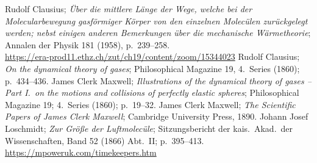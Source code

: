 \begin{thebibliography}{99}
 Rudolf Clausius; \textit{\"Uber die mittlere L\"ange der Wege, welche bei der
       Molecularbewegung gasf\"ormiger K\"orper von den einzelnen Molec\"ulen zur\"uckgelegt werden;
       nebst einigen anderen Bemerkungen \"uber die mechanische W\"armetheorie}; Annalen der Physik 181 (1958),
       p.\ 239--258. \\
       \url{https://era-prod11.ethz.ch/zut/ch19/content/zoom/15344023}
 Rudolf Clausius; \textit{On the dynamical theory of gases}; Philosophical Magazine 19,
         4.\ Series (1860); p.\ 434--436. 
 James Clerk Maxwell; \textit{Illustrations of the dynamical theory of gases -- Part I.\ on the
           motions and collisions of perfectly elastic spheres}; Philosophical Magazine 19; 4.\ Series (1860); 
           p.\ 19--32.               
 James Clerk Maxwell; \textit{The Scientific Papers of James Clerk Maxwell}; Cambridge
              University Press, 1890.            
 Johann Josef Loschmidt; \textit{Zur Gr\"o\ss e der Luftmolec\"ule}; Sitzungsbericht der kais.\ Akad.\
           der Wissenschaften, Band 52 (1866) Abt.\ II; p.\ 395--413.  
           \url{https://mpoweruk.com/timekeepers.htm}
\end{thebibliography}


%

